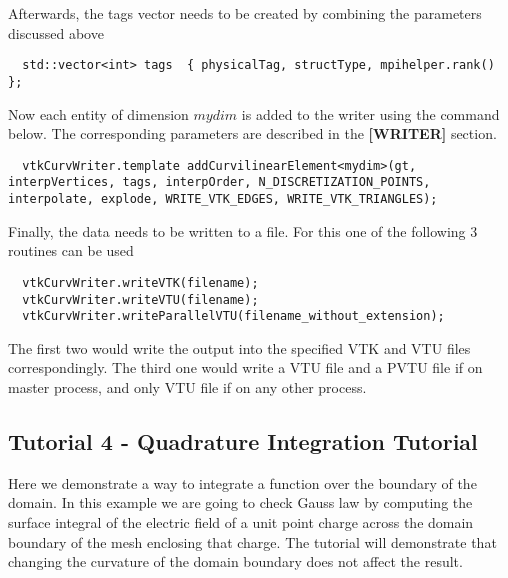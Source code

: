 \noindent
Afterwards, the tags vector needs to be created by combining the parameters discussed above

\begin{mybox}
\begin{lstlisting}
  std::vector<int> tags  { physicalTag, structType, mpihelper.rank() };
\end{lstlisting}
\end{mybox}

\noindent
Now each entity of dimension $mydim$ is added to the writer using the command below. The corresponding parameters are described in the \textbf{[WRITER]} section. \\

\begin{mybox}
\begin{lstlisting}
  vtkCurvWriter.template addCurvilinearElement<mydim>(gt, interpVertices, tags, interpOrder, N_DISCRETIZATION_POINTS, interpolate, explode, WRITE_VTK_EDGES, WRITE_VTK_TRIANGLES);
\end{lstlisting}
\end{mybox}

\noindent
Finally, the data needs to be written to a file. For this one of the following 3 routines can be used \\

\begin{mybox}
\begin{lstlisting}
  vtkCurvWriter.writeVTK(filename);
  vtkCurvWriter.writeVTU(filename);
  vtkCurvWriter.writeParallelVTU(filename_without_extension);
\end{lstlisting}
\end{mybox}

\noindent
The first two would write the output into the specified VTK and VTU files correspondingly. The third one would write a VTU file and a PVTU file if on master process, and only VTU file if on any other process.




\subsection{Tutorial 4 - Quadrature Integration Tutorial}
\label{usage-howto-tutorial-integration-quadrature}

Here we demonstrate a way to integrate a function over the boundary of the domain. In this example we are going to check Gauss law by computing the surface integral of the electric field of a unit point charge across the domain boundary of the mesh enclosing that charge. The tutorial will demonstrate that changing the curvature of the domain boundary does not affect the result. \\


